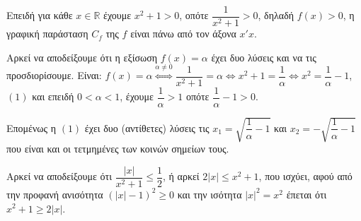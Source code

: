 
\begin{alist}
\item Επειδή για κάθε $x \in \mathbb{R}$ έχουμε $x^2 + 1 > 0$, οπότε $\dfrac{1}{x^2 + 1} > 0$, δηλαδή $f(x) > 0$, η γραφική
παράσταση $C_f$ της $f$ είναι πάνω από τον άξονα $x'x$.

\item Αρκεί να αποδείξουμε ότι η εξίσωση $f(x) = \alpha$ έχει δυο λύσεις και να τις προσδιορίσουμε.
Είναι:
$f(x) = \alpha \stackrel{\alpha \ne 0}{\Leftrightarrow} \dfrac{1}{x^2 + 1} = \alpha \Leftrightarrow x^2 + 1 = \dfrac{1}{\alpha} \Leftrightarrow x^2 = \dfrac{1}{\alpha} - 1$, $(1)$
και επειδή $0 < \alpha < 1$, έχουμε $\dfrac{1}{\alpha} > 1$ οπότε $\dfrac{1}{\alpha} - 1 > 0$.

Επομένως η $(1)$ έχει δυο (αντίθετες) λύσεις τις $x_1 = \sqrt{\dfrac{1}{\alpha} - 1}$ και $x_2 = -\sqrt{\dfrac{1}{\alpha} - 1}$ που είναι και οι
τετμημένες των κοινών σημείων τους.

\item Αρκεί να αποδείξουμε ότι $\dfrac{|x|}{x^2 + 1} \le \dfrac{1}{2}$, ή αρκεί $2|x| \le x^2 + 1$,
που ισχύει, αφού από την προφανή ανισότητα $(|x| - 1)^2 \ge 0$ και την ισότητα $|x|^2 = x^2$ έπεται
ότι $x^2 + 1 \ge 2|x|$.
\end{alist}

